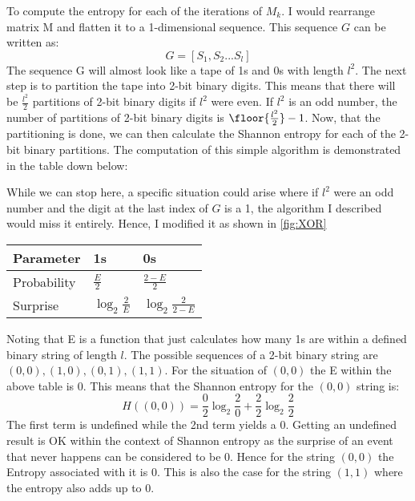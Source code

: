 \vspace{0.3cm}
To compute the entropy for each of the iterations of $M_{k}$. I would rearrange matrix M and flatten it to a 1-dimensional sequence. This sequence $G$ can be written as:
$$G=[S_{1}, S_{2}...S_{l}]$$
The sequence G will almost look like a tape of 1s and 0s with length $l^{2}$. The next step is to partition the tape into 2-bit binary digits. This means that there will be $\frac{l^{2}}{2}$ partitions of 2-bit binary digits if $l^{2}$ were even. If $l^{2}$ is an odd number, the number of partitions of 2-bit binary digits is $ \floor{\frac{l^{2}}{2}}-1$. Now, that the partitioning is done, we can then calculate the Shannon entropy for each of the 2-bit binary partitions. The computation of this simple algorithm is demonstrated in the table down below: \par
\vspace{0.3cm}
{\scriptsize{ While we can stop here, a specific situation could arise where if $l^{2}$ were an odd number and the digit at the last index of $G$ is a 1, the algorithm I described would miss it entirely. Hence, I modified it as shown in \ref{fig:XOR}}}
\begin{center}
\begin{tabular}{ |p{3cm}||p{3cm}||p{3cm}|  }
\hline
Parameter& 1s & 0s \\
 \hline
 Probability  & $\frac{E}{2}$ & $\frac{2-E}{2}$\\  
 Surprise &   $\log_{2}\frac{2}{E}$ & $\log_{2}\frac{2}{2-E}$ \\[1.5ex] 
  \hline
\end{tabular}
\end{center}
Noting that E is a function that just calculates how many 1s are within a defined binary string of length $l$. The possible sequences of a 2-bit binary string are $(0,0), (1,0), (0,1), (1,1)$. For the situation of $(0,0)$ the E within the above table is 0. This means that the Shannon entropy for the $(0,0)$ string is: 
$$H((0,0))=\frac{0}{2}\log_{2}\frac{2}{0}+\frac{2}{2}\log_{2}\frac{2}{2}$$
The first term is undefined while the 2nd term yields a 0. Getting an undefined result is OK within the context of Shannon entropy as the surprise of an event that never happens can be considered to be 0. Hence for the string $(0,0)$ the Entropy associated with it is 0. This is also the case for the string $(1,1)$ where the entropy also adds up to 0. \par

